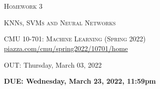 \documentclass[12pt]{article}
\begin{document}
\section*{}
\begin{center}
  \centerline{\textsc{\LARGE  Homework 3}}
  \vspace{0.5em}
  \centerline{\textsc{\large KNNs, SVMs and Neural Networks}}%
  \vspace{1em}
  \textsc{\large CMU 10-701: Machine Learning (Spring 2022)} \\
  \vspace{0.5em}
  \url{piazza.com/cmu/spring2022/10701/home} \\
  \vspace{0.5em}
  \centerline{OUT: Thursday, March 03, 2022}
  \vspace{0.5em}
  \centerline{\textbf{DUE: Wednesday, March 23, 2022, 11:59pm}}
\end{center}
\end{document}
